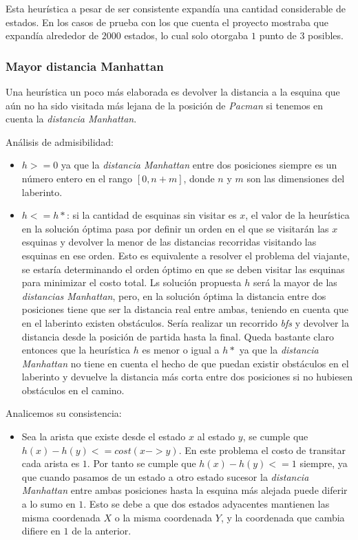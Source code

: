 \documentclass[12pt]{article}
\begin{document}
Esta heur\'istica a pesar de ser consistente expand\'ia una cantidad considerable de estados. En los casos de prueba con los que cuenta el proyecto mostraba que expand\'ia alrededor de $2000$ estados, lo cual solo otorgaba $1$ punto de $3$ posibles.

\subsubsection{Mayor distancia Manhattan}

Una heur\'istica un poco m\'as elaborada es devolver la distancia a la esquina que a\'un no ha sido visitada m\'as lejana de la posici\'on de \emph{Pacman} si tenemos en cuenta la \emph{distancia Manhattan}.

An\'alisis de admisibilidad:

\begin{itemize}
\item $h >= 0$ ya que la \emph{distancia Manhattan} entre dos posiciones siempre es un n\'umero entero en el rango $[0, n + m]$, donde $n$ y $m$ son las dimensiones del laberinto.

\item $h <= h*$: si la cantidad de esquinas sin visitar es $x$, el valor de la heur\'istica en la soluci\'on \'optima pasa por definir un orden en el que se visitar\'an las $x$ esquinas y devolver la menor de las distancias recorridas visitando las esquinas en ese orden. Esto es equivalente a resolver el problema del viajante, se estar\'ia determinando el orden \'optimo en que se deben visitar las esquinas para minimizar el costo total. Ls soluci\'on propuesta $h$ ser\'a la mayor de las \emph{distancias Manhattan}, pero, en la soluci\'on \'optima la distancia entre dos posiciones tiene que ser la distancia real entre ambas, teniendo en cuenta que en el laberinto existen obst\'aculos. Ser\'ia realizar un recorrido \emph{bfs} y devolver la distancia desde la posici\'on de partida hasta la final. Queda bastante claro entonces que la heur\'istica $h$ es menor o igual a $h*$ ya que la \emph{distancia Manhattan} no tiene en cuenta el hecho de que puedan existir obst\'aculos en el laberinto y devuelve la distancia m\'as corta entre dos posiciones si no hubiesen obst\'aculos en el camino.

\end{itemize}

Analicemos su consistencia:

\begin{itemize}
\item Sea la arista que existe desde el estado $x$ al estado $y$, se cumple que $h(x) - h(y) <= cost(x->y)$. En este problema el costo de transitar cada arista es $1$. Por tanto se cumple que $h(x) - h(y) <= 1$ siempre, ya que cuando pasamos de un estado a otro estado sucesor la \emph{distancia Manhattan} entre ambas posiciones hasta la esquina m\'as alejada puede diferir a lo sumo en $1$. Esto se debe a que dos estados adyacentes mantienen las misma coordenada $X$ o la misma coordenada $Y$, y la coordenada que cambia difiere en $1$ de la anterior.

\end{itemize}
\end{document}
